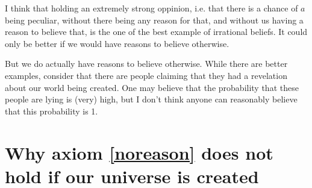 \documentclass[a4paper
,draft
]{article}
\begin{document}
I think that holding an extremely strong oppinion, i.e. that there is a chance of $a$ being peculiar, without there being any reason for that, and without us having a reason to believe that, is the one of the best example of irrational beliefs. It could only be better if we would have reasons to believe otherwise.

But we do actually have reasons to believe otherwise. While there are better examples, consider that there are people claiming that they had a revelation about our world being created. One may believe that the probability that these people are lying is (very) high, but I don't think anyone can reasonably believe that this probability is 1.

\section{Why axiom \ref{noreason} does not hold if our universe is created}
\end{document}
